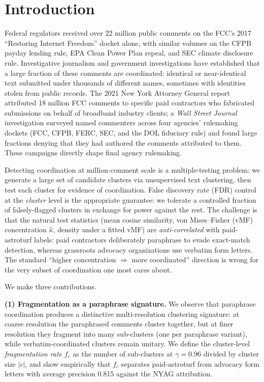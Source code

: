 \documentclass{article}
\theoremstyle{definition}
\theoremstyle{remark}
\begin{document}
\section{Introduction}

Federal regulators received over 22 million public comments on the FCC's 2017 ``Restoring Internet Freedom'' docket alone, with similar volumes on the CFPB payday lending rule, EPA Clean Power Plan repeal, and SEC climate disclosure rule. Investigative journalism and government investigations have established that a large fraction of these comments are coordinated: identical or near-identical text submitted under thousands of different names, sometimes with identities stolen from public records. The 2021 New York Attorney General report \citep{nyag2021} attributed 18 million FCC comments to specific paid contractors who fabricated submissions on behalf of broadband industry clients; a \emph{Wall Street Journal} investigation \citep{wsj2017} surveyed named commenters across four agencies' rulemaking dockets (FCC, CFPB, FERC, SEC, and the DOL fiduciary rule) and found large fractions denying that they had authored the comments attributed to them. These campaigns directly shape final agency rulemaking.

Detecting coordination at million-comment scale is a multiple-testing problem: we generate a large set of candidate clusters via unsupervised text clustering, then test each cluster for evidence of coordination. False discovery rate (FDR) control at the \emph{cluster} level is the appropriate guarantee: we tolerate a controlled fraction of falsely-flagged clusters in exchange for power against the rest. The challenge is that the natural test statistics (mean cosine similarity, von Mises--Fisher (vMF) concentration $\hat\kappa$, density under a fitted vMF) are \emph{anti-correlated} with paid-astroturf labels: paid contractors deliberately paraphrase to evade exact-match detection, whereas grassroots advocacy organizations use verbatim form letters. The standard ``higher concentration $\Rightarrow$ more coordinated'' direction is wrong for the very subset of coordination one most cares about.

We make three contributions.

\textbf{(1) Fragmentation as a paraphrase signature.} We observe that paraphrase coordination produces a distinctive multi-resolution clustering signature: at coarse resolution the paraphrased comments cluster together, but at finer resolution they fragment into many sub-clusters (one per paraphrase variant), while verbatim-coordinated clusters remain unitary. We define the cluster-level \emph{fragmentation rate} $f_c$ as the number of sub-clusters at $\gamma = 0.96$ divided by cluster size $|c|$, and show empirically that $f_c$ separates paid-astroturf from advocacy form letters with average precision 0.815 against the NYAG attribution.
\end{document}
